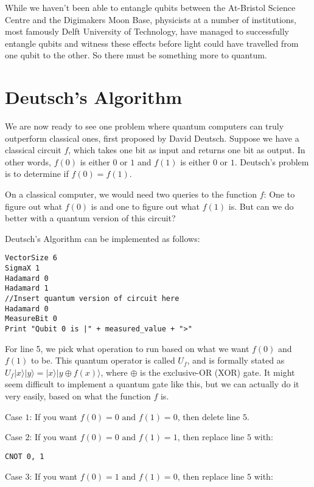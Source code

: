 \documentclass[twocolumn]{article}
\begin{document}
While we haven't been able to entangle qubits between the At-Bristol Science Centre and the Digimakers Moon Base, physicists at a number of institutions, most famously Delft University of Technology, have managed to successfully entangle qubits and witness these effects before light could have travelled from one qubit to the other. So there must be something more to quantum.

\section{Deutsch's Algorithm}

We are now ready to see one problem where quantum computers can truly outperform classical ones, first proposed by David Deutsch. Suppose we have a classical circuit $f$, which takes one bit as input and returns one bit as output. In other words, $f(0)$ is either $0$ or $1$ and $f(1)$ is either $0$ or $1$. Deutsch's problem is to determine if $f(0) = f(1)$.

On a classical computer, we would need two queries to the function $f$: One to figure out what $f(0)$ is and one to figure out what $f(1)$ is. But can we do better with a quantum version of this circuit?

Deutsch's Algorithm can be implemented as follows:

\begin{lstlisting}
VectorSize 6
SigmaX 1
Hadamard 0
Hadamard 1
//Insert quantum version of circuit here
Hadamard 0
MeasureBit 0
Print "Qubit 0 is |" + measured_value + ">"
\end{lstlisting}

For line 5, we pick what operation to run based on what we want $f(0)$ and $f(1)$ to be. This quantum operator is called $U_f$, and is formally stated as $U_f|x\rangle|y\rangle = |x\rangle|y \oplus f(x)\rangle$, where $\oplus$ is the exclusive-OR (XOR) gate. It might seem difficult to implement a quantum gate like this, but we can actually do it very easily, based on what the function $f$ is.

Case $1$: If you want $f(0) = 0 \text{ and } f(1) = 0$, then delete line $5$.

Case $2$: If you want $f(0) = 0 \text{ and } f(1) = 1$, then replace line $5$ with:

\begin{lstlisting}
CNOT 0, 1
\end{lstlisting}

Case $3$: If you want $f(0) = 1 \text{ and } f(1) = 0$, then replace line $5$ with:
\end{document}
